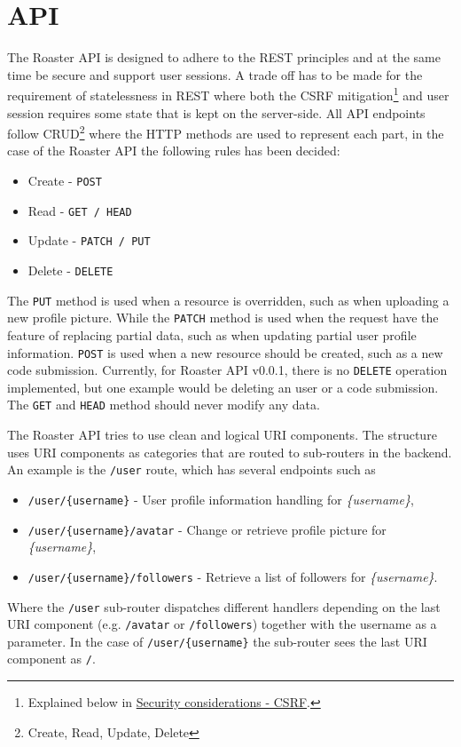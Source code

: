 \documentclass[12pt,a4paper]{report}
\begin{document}
\section{API}
The Roaster API is designed to adhere to the REST principles and at the same time be secure and support user sessions. A trade off has to be made for the requirement of statelessness in REST\cite{fielding-rest} where both the CSRF mitigation\footnote{Explained below in \hyperref[subsec:csrf]{Security considerations - CSRF}.} and user session requires some state that is kept on the server-side. All API endpoints follow CRUD\footnote{Create, Read, Update, Delete} where the HTTP methods are used to represent each part, in the case of the Roaster API the following rules has been decided:
\begin{itemize}
    \item Create - \texttt{POST}
    \item Read - \texttt{GET / HEAD}
    \item Update - \texttt{PATCH / PUT}
    \item Delete - \texttt{DELETE}
\end{itemize}
The \texttt{PUT} method is used when a resource is overridden, such as when uploading a new profile picture. While the \texttt{PATCH} method is used when the request have the feature of replacing partial data, such as when updating partial user profile information. \texttt{POST} is used when a new resource should be created, such as a new code submission. Currently, for Roaster API v0.0.1, there is no \texttt{DELETE} operation implemented, but one example would be deleting an user or a code submission. The \texttt{GET} and \texttt{HEAD} method should never modify any data.

The Roaster API tries to use clean and logical URI components. The structure uses URI components as categories that are routed to sub-routers in the backend. An example is the \texttt{/user} route, which has several endpoints such as
\begin{itemize}
    \item \texttt{/user/\{username\}} - User profile information handling for \textit{\{username\}},
    \item \texttt{/user/\{username\}/avatar} - Change or retrieve profile picture for \textit{\{username\}},
    \item \texttt{/user/\{username\}/followers} - Retrieve a list of followers for \textit{\{username\}}.
\end{itemize}
Where the \texttt{/user} sub-router dispatches different handlers depending on the last URI component (e.g. \texttt{/avatar} or \texttt{/followers}) together with the username as a parameter. In the case of \texttt{/user/\{username\}} the sub-router sees the last URI component as \texttt{/}.
\end{document}

